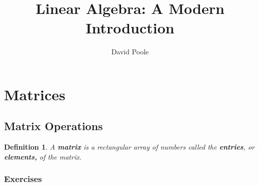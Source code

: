 \documentclass{article}
\title{Linear Algebra: A Modern Introduction}
\author{David Poole}
\date{}
\newtheorem*{definition*}{Definition}
\begin{document}
\maketitle
\setcounter{section}{2}
\section{Matrices}
\subsection{Matrix Operations}
\begin{definition*}
	A \textbf{\textit{matrix}} is a rectangular array of numbers called the \textbf{\textit{entries}},
	or \textbf{\textit{elements,}} of the matrix.
\end{definition*}
\subsubsection*{Exercises}
\end{document}
